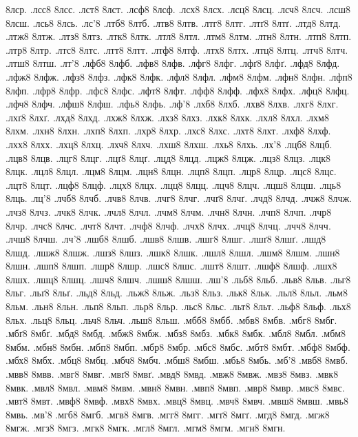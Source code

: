 {8лср.
.лсс8
8лсс.
.лст8
8лст.
.лсф8
8лсф.
.лсх8
8лсх.
.лсц8
8лсц.
.лсч8
8лсч.
.лсш8
8лсш.
.лсь8
8лсь.
.лс'8
.лтб8
8лтб.
.лтв8
8лтв.
.лтг8
8лтг.
.лтґ8
8лтґ.
.лтд8
8лтд.
.лтж8
8лтж.
.лтз8
8лтз.
.лтк8
8лтк.
.лтл8
8лтл.
.лтм8
8лтм.
.лтн8
8лтн.
.лтп8
8лтп.
.лтр8
8лтр.
.лтс8
8лтс.
.лтт8
8лтт.
.лтф8
8лтф.
.лтх8
8лтх.
.лтц8
8лтц.
.лтч8
8лтч.
.лтш8
8лтш.
.лт'8
.лфб8
8лфб.
.лфв8
8лфв.
.лфг8
8лфг.
.лфґ8
8лфґ.
.лфд8
8лфд.
.лфж8
8лфж.
.лфз8
8лфз.
.лфк8
8лфк.
.лфл8
8лфл.
.лфм8
8лфм.
.лфн8
8лфн.
.лфп8
8лфп.
.лфр8
8лфр.
.лфс8
8лфс.
.лфт8
8лфт.
.лфф8
8лфф.
.лфх8
8лфх.
.лфц8
8лфц.
.лфч8
8лфч.
.лфш8
8лфш.
.лфь8
8лфь.
.лф'8
.лхб8
8лхб.
.лхв8
8лхв.
.лхг8
8лхг.
.лхґ8
8лхґ.
.лхд8
8лхд.
.лхж8
8лхж.
.лхз8
8лхз.
.лхк8
8лхк.
.лхл8
8лхл.
.лхм8
8лхм.
.лхн8
8лхн.
.лхп8
8лхп.
.лхр8
8лхр.
.лхс8
8лхс.
.лхт8
8лхт.
.лхф8
8лхф.
.лхх8
8лхх.
.лхц8
8лхц.
.лхч8
8лхч.
.лхш8
8лхш.
.лхь8
8лхь.
.лх'8
.лцб8
8лцб.
.лцв8
8лцв.
.лцг8
8лцг.
.лцґ8
8лцґ.
.лцд8
8лцд.
.лцж8
8лцж.
.лцз8
8лцз.
.лцк8
8лцк.
.лцл8
8лцл.
.лцм8
8лцм.
.лцн8
8лцн.
.лцп8
8лцп.
.лцр8
8лцр.
.лцс8
8лцс.
.лцт8
8лцт.
.лцф8
8лцф.
.лцх8
8лцх.
.лцц8
8лцц.
.лцч8
8лцч.
.лцш8
8лцш.
.лць8
8лць.
.лц'8
.лчб8
8лчб.
.лчв8
8лчв.
.лчг8
8лчг.
.лчґ8
8лчґ.
.лчд8
8лчд.
.лчж8
8лчж.
.лчз8
8лчз.
.лчк8
8лчк.
.лчл8
8лчл.
.лчм8
8лчм.
.лчн8
8лчн.
.лчп8
8лчп.
.лчр8
8лчр.
.лчс8
8лчс.
.лчт8
8лчт.
.лчф8
8лчф.
.лчх8
8лчх.
.лчц8
8лчц.
.лчч8
8лчч.
.лчш8
8лчш.
.лч'8
.лшб8
8лшб.
.лшв8
8лшв.
.лшг8
8лшг.
.лшґ8
8лшґ.
.лшд8
8лшд.
.лшж8
8лшж.
.лшз8
8лшз.
.лшк8
8лшк.
.лшл8
8лшл.
.лшм8
8лшм.
.лшн8
8лшн.
.лшп8
8лшп.
.лшр8
8лшр.
.лшс8
8лшс.
.лшт8
8лшт.
.лшф8
8лшф.
.лшх8
8лшх.
.лшц8
8лшц.
.лшч8
8лшч.
.лшш8
8лшш.
.лш'8
.льб8
8льб.
.льв8
8льв.
.льг8
8льг.
.льґ8
8льґ.
.льд8
8льд.
.льж8
8льж.
.льз8
8льз.
.льк8
8льк.
.льл8
8льл.
.льм8
8льм.
.льн8
8льн.
.льп8
8льп.
.льр8
8льр.
.льс8
8льс.
.льт8
8льт.
.льф8
8льф.
.льх8
8льх.
.льц8
8льц.
.льч8
8льч.
.льш8
8льш.
.мбб8
8мбб.
.мбв8
8мбв.
.мбг8
8мбг.
.мбґ8
8мбґ.
.мбд8
8мбд.
.мбж8
8мбж.
.мбз8
8мбз.
.мбк8
8мбк.
.мбл8
8мбл.
.мбм8
8мбм.
.мбн8
8мбн.
.мбп8
8мбп.
.мбр8
8мбр.
.мбс8
8мбс.
.мбт8
8мбт.
.мбф8
8мбф.
.мбх8
8мбх.
.мбц8
8мбц.
.мбч8
8мбч.
.мбш8
8мбш.
.мбь8
8мбь.
.мб'8
.мвб8
8мвб.
.мвв8
8мвв.
.мвг8
8мвг.
.мвґ8
8мвґ.
.мвд8
8мвд.
.мвж8
8мвж.
.мвз8
8мвз.
.мвк8
8мвк.
.мвл8
8мвл.
.мвм8
8мвм.
.мвн8
8мвн.
.мвп8
8мвп.
.мвр8
8мвр.
.мвс8
8мвс.
.мвт8
8мвт.
.мвф8
8мвф.
.мвх8
8мвх.
.мвц8
8мвц.
.мвч8
8мвч.
.мвш8
8мвш.
.мвь8
8мвь.
.мв'8
.мгб8
8мгб.
.мгв8
8мгв.
.мгг8
8мгг.
.мгґ8
8мгґ.
.мгд8
8мгд.
.мгж8
8мгж.
.мгз8
8мгз.
.мгк8
8мгк.
.мгл8
8мгл.
.мгм8
8мгм.
.мгн8
8мгн.
}
